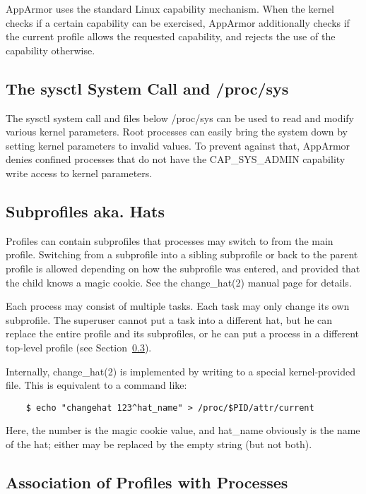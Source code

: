 \documentclass[a4paper]{article}
\renewcommand{\H}{\hspace{0pt}}
\begin{document}
AppArmor uses the standard Linux capability mechanism.  When the kernel
checks if a certain capability can be exercised, AppArmor additionally
checks if the current profile allows the requested capability, and
rejects the use of the capability otherwise.


\subsection{The sysctl System Call and /proc/sys}

The sysctl system call and files below /proc/sys
can be used to read and modify various kernel parameters.  Root processes
can easily bring the system down by setting kernel parameters to invalid
values.  To prevent against that, AppArmor denies confined processes
that do not have the CAP\_{\H}SYS\_{\H}ADMIN capability write access to kernel
parameters.


\subsection{Subprofiles aka. Hats}

Profiles can contain subprofiles that processes may switch to from the
main profile.  Switching from a subprofile into a sibling subprofile or
back to the parent profile is allowed depending on how the subprofile
was entered, and provided that the child knows a magic cookie.  See the
change\_hat(2) manual page for details.

Each process may consist of multiple tasks.  Each task may only change
its own subprofile.  The superuser cannot put a task into a different
hat, but he can replace the entire profile and its subprofiles, or he
can put a process in a different top-level profile (see
Section~\ref{sec:association}).

Internally, change\_hat(2) is implemented by writing to a special
kernel-provided file.  This is equivalent to a command like:

\begin{small}
\begin{verbatim}
    $ echo "changehat 123^hat_name" > /proc/$PID/attr/current
\end{verbatim}
\end{small}

Here, the number is the magic cookie value, and hat\_name obviously is
the name of the hat; either may be replaced by the empty string (but not
both).


\subsection{Association of Profiles with Processes}
\label{sec:association}
\end{document}
